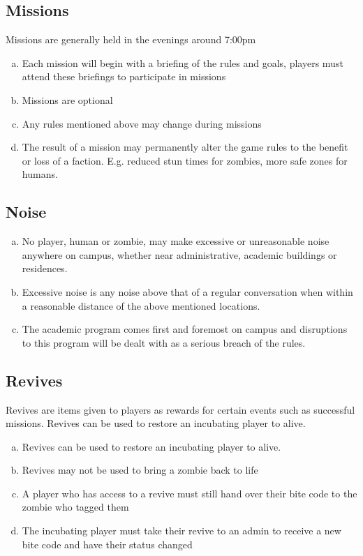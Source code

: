 \documentclass[a4paper,12pt]{article}
\begin{document}
\subsection{Missions}
Missions are generally held in the evenings around 7:00pm
\begin{enumerate}[(a)]
	\item Each mission will begin with a briefing of the rules and goals, players must attend these briefings to participate in missions
	\item Missions are optional
	\item Any rules mentioned above may change during missions
	\item The result of a mission may permanently alter the game rules to the benefit or loss of a faction. E.g. reduced stun times for zombies, more safe zones for humans.
\end{enumerate}

\subsection{Noise}
\begin{enumerate}[(a)]
	\item No player, human or zombie, may make excessive or unreasonable noise anywhere on campus, whether near administrative, academic buildings or residences.
	\item Excessive noise is any noise above that of a regular conversation when within a reasonable distance of the above mentioned locations.
    \item The academic program comes first and foremost on campus and disruptions to this program will be dealt with as a serious breach of the rules.
\end{enumerate}

\subsection{Revives}
Revives are items given to players as rewards for certain events such as successful missions. Revives can be used to restore an incubating player to alive.
\begin{enumerate}[(a)]
	\item Revives can be used to restore an incubating player to alive.
	\item Revives may not be used to bring a zombie back to life
	\item A player who has access to a revive must still hand over their bite code to the zombie who tagged them
	\item The incubating player must take their revive to an admin to receive a new bite code and have their status changed 

\end{enumerate}
\end{document}
